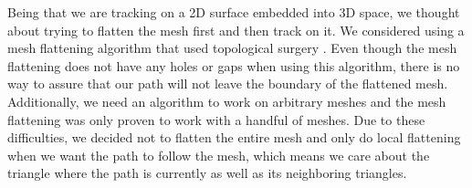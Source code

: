 Being that we are tracking on a 2D surface embedded into 3D space, we thought about trying to flatten the mesh first and then track on it. We considered using a mesh flattening algorithm that used topological surgery \cite{meshunfolding}. Even though the mesh flattening does not have any holes or gaps when using this algorithm, there is no way to assure that our path will not leave the boundary of the flattened mesh. Additionally, we need an algorithm to work on arbitrary meshes and the mesh flattening was only proven to work with a handful of meshes. Due to these difficulties, we decided not to flatten the entire mesh and only do local flattening when we want the path to follow the mesh, which means we care about the triangle where the path is currently as well as its neighboring triangles. 